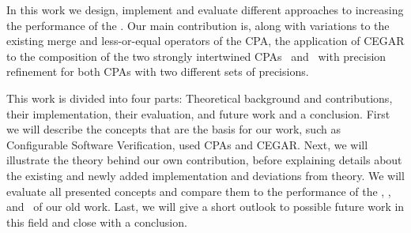 In this work we design, implement and evaluate different approaches to increasing the performance of the \symbolicExecutionCPA.
Our main contribution is, along with variations to the existing merge and less-or-equal operators of the CPA,
the application of CEGAR \cite{Clarke2003} to the composition of the two strongly intertwined CPAs \symbolicValueAnalysisCPA\ and \constraintsCPA\ with precision refinement for both CPAs
with two different sets of precisions.

This work is divided into four parts: Theoretical background and contributions, their implementation, their evaluation, and future work and a conclusion.
First we will describe the concepts that are the basis for our work, such as Configurable Software Verification, used CPAs and CEGAR.
Next, we will illustrate the theory behind our own contribution,
before explaining details about the existing and newly added implementation and deviations from theory.
We will evaluate all presented concepts and compare them to the performance of the , \predicateCPA, and \symbolicExecutionCPA\ of our old work.
Last, we will give a short outlook to possible future work in this field and close with a conclusion.
